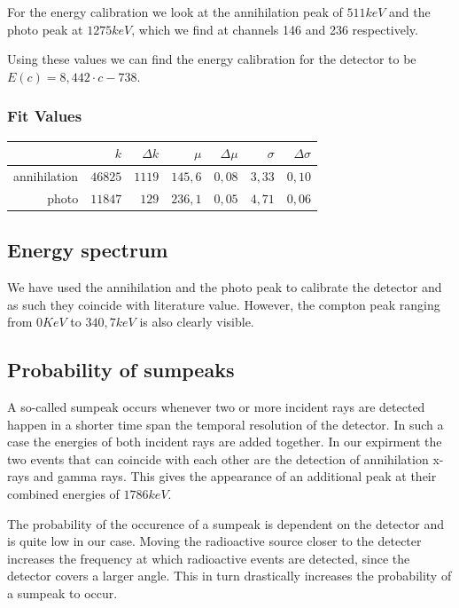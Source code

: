\documentclass[bigchapter,colorback,accentcolor=tud4b,linedtoc,11pt]{tudreport}
\begin{document}
For the energy calibration we look at the annihilation peak of $511 keV$ and the
photo peak at $1275 keV$, which we find at channels 146 and 236 respectively.

Using these values we can find the energy calibration for the detector to be $E(c) = 8,442 \cdot c - 738$.

\subsubsection{Fit Values}
\begin{center}
  \begin{tabular}{r|r|r|r|r|r|r}
                  & $k$     & $\Delta k$ & $\mu$   & $\Delta \mu$ & $\sigma$ & $\Delta \sigma$ \\ \hline
     annihilation & $46825$ & $1119$     & $145,6$ & $0,08$       & $3,33$   & $0,10$          \\ \hline
     photo        & $11847$ & $129$      & $236,1$ & $0,05$       & $4,71$   & $0,06$          \\
	\end{tabular}
\end{center}


\subsection{Energy spectrum}
We have used the annihilation and the photo peak to calibrate the detector and
as such they coincide with literature value. However, the compton peak ranging
from $0 KeV$ to $340,7 keV$ is also clearly visible.




\subsection{Probability of sumpeaks}
A so-called sumpeak occurs whenever two or more incident rays are detected happen in a
shorter time span the temporal resolution of the detector. In such a case the
energies of both incident rays are added together. In our expirment the two
events that can coincide with each other are the detection of annihilation
x-rays and gamma rays. This gives the appearance of an additional peak at their
combined energies of $1786 keV$.

The probability of the occurence of a sumpeak is dependent on the detector and
is quite low in our case. Moving the radioactive source closer to the detecter
increases the frequency at which radioactive events are detected, since the
detector covers a larger angle. This in turn drastically increases the
probability of a sumpeak to occur.
\end{document}
